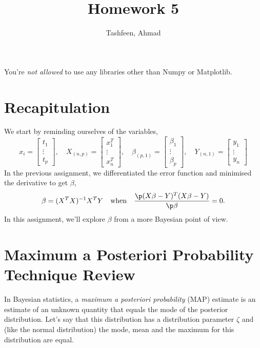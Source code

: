 \documentclass{homework}
\author{Tashfeen, Ahmad}
\title{Homework 5}
\begin{document}
 \maketitle
You're \textit{not allowed} to use any libraries other than Numpy or Matplotlib.

\section{Recapitulation}

We start by reminding ourselves of the variables,
\[
  x_i =
  \begin{bmatrix}
    t_1 \\ \vdots \\ t_{p}%
  \end{bmatrix},
  \quad
  X_{(n, p)} =
  \begin{bmatrix}
    x^T_1 \\ \vdots \\ x^T_n
  \end{bmatrix},
  \quad
  \beta_{(p, 1)} =
  \begin{bmatrix}
    \beta_1 \\ \vdots \\ \beta_p
  \end{bmatrix},
  \quad
  Y_{(n, 1)} =
  \begin{bmatrix}
    y_1 \\ \vdots \\ y_n
  \end{bmatrix}
\]
In the previous assignment, we differentiated the error function and minimised the derivative to get $\beta$,
\[
    \beta = (X^TX)^{-1}X^TY \quad\text{when}\quad \frac{\p (X\beta - Y)^T(X\beta - Y)}{\p \beta} = 0.
\]
In this assignment, we'll explore $\beta$ from a more Bayesian point of view.

\section{Maximum a Posteriori Probability Technique Review}

In Bayesian statistics, a \textit{maximum a posteriori probability} (MAP) estimate is an estimate of an unknown quantity that equals the mode of the posterior distribution. Let's say that this distribution has a distribution parameter $\zeta$ and (like the normal distribution) the mode, mean and the maximum for this distribution are equal.
\end{document}
